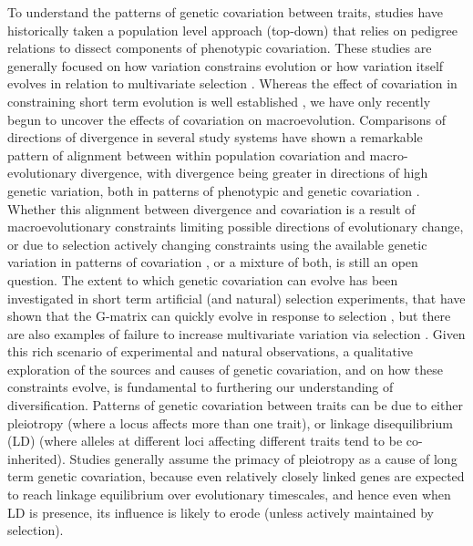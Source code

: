 \begin{refsection}
To understand the patterns of genetic covariation between traits, studies have
historically taken a population level approach (top-down) that relies on
pedigree relations to dissect components of phenotypic covariation. These
studies are generally focused on how variation constrains evolution or how
variation itself evolves in relation to multivariate selection
\parencite{Arnold2008-pc,Futuyma2010-jl}. Whereas the effect of covariation in
constraining short term evolution is well established
\parencite{Lande1979-by,Grant1995-er,Schluter1996-gw} , we have only recently
begun to uncover the effects of covariation on macroevolution. Comparisons of
directions of divergence in several study systems have shown a remarkable
pattern of alignment between within population covariation and macro-
evolutionary divergence, with divergence being greater in directions of high
genetic variation, both in patterns of phenotypic
\parencite{Marroig2005-ce,Punzalan2016-lb,Simon2016-ed} and genetic
covariation \parencite{Houle2017-ph,McGlothlin2018-hm}. Whether this alignment
between divergence and covariation is a result of macroevolutionary
constraints limiting possible directions of evolutionary change, or due to
selection actively changing constraints using the available genetic variation
in patterns of covariation
\parencite{Arnold2001-lz,Pavlicev2011-xm,Pavlicev2015-up,Walter2018-dw}, or a
mixture of both, is still an open question. The extent to which genetic
covariation can evolve has been investigated in short term artificial (and
natural) selection experiments, that have shown that the G-matrix can quickly
evolve in response to selection
\parencite{Careau2015-sy,Assis2016-vz,Penna2017-if}, but there are also
examples of failure to increase multivariate variation via selection
\parencite{Sztepanacz2017-ot}. Given this rich scenario of experimental and
natural observations, a qualitative exploration of the sources and causes of
genetic covariation, and on how these constraints evolve, is fundamental to
furthering our understanding of diversification. Patterns of genetic
covariation between traits can be due to either pleiotropy (where a locus
affects more than one trait), or linkage disequilibrium (LD) (where alleles at
different loci affecting different traits tend to be co-inherited). Studies
generally assume the primacy of pleiotropy as a cause of long term genetic
covariation, because even relatively closely linked genes are expected to
reach linkage equilibrium over evolutionary timescales, and hence even when LD
is presence, its influence is likely to erode (unless actively maintained by
selection).


\end{refsection}
